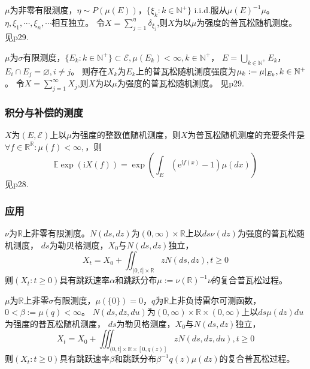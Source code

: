 \documentclass[main]{subfiles}
\begin{document}
\begin{theorem}\label{the:普瓦松随机测度的存在性}
  \(\mu\)为非零有限测度，\(\eta \sim P(\mu(E))\)，\(\{\xi_k:k \in \mathbb{N}^+\}\) i.i.d.服从\(\mu(E)^{-1}\mu\)。\(\eta,\xi_1,\cdots,\xi_n,\cdots\)相互独立。
  令\(X=\sum_{j=1}^{\eta} \delta_{\xi_j}\),则\(X\)为以\(\mu\)为强度的普瓦松随机测度。
  见p29.
\end{theorem}
\begin{theorem}\label{the:1.5.5}
  \(\mu\)为\(\sigma\)有限测度，\(\{E_k:k \in \mathbb{N}^+\}\subset \mathcal{E},\mu(E_k)<\infty,k \in \mathbb{N}^+\)，
  \(E=\bigcup_{k \in \mathbb{N}^+}E_k\)，\(E_i \cap E_j=\varnothing,i \neq j\)。
  则存在\(X_k\)为\(E_k\)上的普瓦松随机测度强度为\(\mu_k:=\mu|_{E_k},k \in \mathbb{N}^+\)。
  令\(X=\sum_{j=1}^{\infty} X_j\),则\(X\)为以\(\mu\)为强度的普瓦松随机测度。
  见p29.
\end{theorem}
\subsubsection{积分与补偿的测度}
\begin{theorem}\label{the:普瓦松随机测度的充要条件2}
  \(X\)为\((E,\mathcal{E})\)上以\(\mu\)为强度的整数值随机测度，则\(X\)为普瓦松随机测度的充要条件是
  \(\forall f \in \mathbb{R}^{\mathbb{R}}:\mu(f)< \infty ,\)，则\[
    \mathbb{E}\exp(\mathrm{i}X(f))=\exp(\int_{E}(\mathrm{e}^{\mathrm{i}f(x)}-1)\mu(dx))
  \]
  见p28.
\end{theorem}
\subsubsection{应用}
\begin{theorem}\label{the:复合普瓦松过程构造}
  \(\nu\)为\(\mathbb{R}\)上非零有限测度。\(N(ds,dz)\)为\((0,\infty)\times \mathbb{R}\)上以\(ds \nu(dz)\)为强度的普瓦松随机测度，
  \(ds\)为勒贝格测度，\(X_0\)与\(N(ds,dz)\)独立，\[
    X_t=X_0 + \iint_{(0,t]\times \mathbb{R}}z N(ds,dz),t \geq 0
  \]
  则\((X_t:t \geq 0)\)具有跳跃速率\(\alpha\)和跳跃分布\(\mu:=\nu(\mathbb{R})^{-1}\nu\)的复合普瓦松过程。
\end{theorem}
\begin{theorem}\label{the:复合普瓦松过程构造2}
  \(\mu\)为\(\mathbb{R}\)上非零\(\sigma\)有限测度，\(\mu(\{0\})=0\)，\(q\)为\(\mathbb{R}\)上非负博雷尔可测函数，\(0 < \beta :=\mu(q)<\infty\)。
  \(N(ds,dz,du)\)为\((0,\infty)\times \mathbb{R}\times(0,\infty)\)上以\(ds \mu(dz)du\)为强度的普瓦松随机测度，
  \(ds\)为勒贝格测度，\(X_0\)与\(N(ds,dz)\)独立，\[
    X_t=X_0 + \iiint_{(0,t]\times \mathbb{R}\times[0,q(z)]}z N(ds,dz,du),t \geq 0
  \]
  则\((X_t:t \geq 0)\)具有跳跃速率\(\beta\)和跳跃分布\(\beta^{-1}q(z)\mu(dz)\)的复合普瓦松过程。
\end{theorem}

\ifSubfilesClassLoaded{%
  \printindex }{%
}
\end{document}
